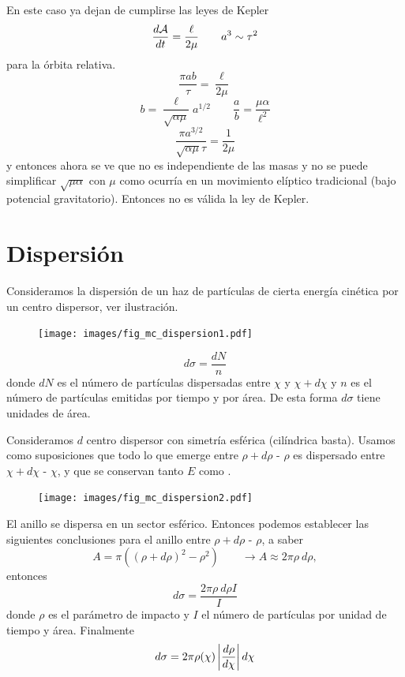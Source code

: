 \documentclass[10pt,oneside]{CBFT_book}
\begin{document}
En este caso ya dejan de cumplirse las leyes de Kepler
\[
	\frac{d^{\hspace{-0.05em}} {\mathcal{A}}}{d {t}^{\hspace{-0.05em}}} = \frac{\ell}{2\mu} \qquad a^3 \sim \tau^2 
\]
para la órbita relativa.
\[
	\frac{\pi a b }{\tau}= \frac{\ell}{2\mu} 
\]
\[
	b = \frac{\ell}{\sqrt{\alpha \mu}} a^{1/2} \qquad \frac{a}{b} = \frac{\mu \alpha}{\ell^2}
\]
\[
	\frac{\pi a^{3/2}}{\sqrt{\alpha \mu} \tau} = \frac{1}{2\mu}
\]
y entonces ahora se ve que no es independiente de las masas y no se puede simplificar $\sqrt{\mu\alpha}$ con
$\mu$ como ocurría en un movimiento elíptico tradicional (bajo potencial gravitatorio).
Entonces no es válida la ley de Kepler.
\section{Dispersión}

Consideramos la dispersión de un haz de partículas de cierta energía cinética por un centro dispersor,
ver ilustración.

\begin{figure}[htb]
	\begin{center}
	\texttt{[image: images/fig\_mc\_dispersion1.pdf]}	 
	\end{center}
	\caption{}
\end{figure} 
\[
	d\sigma = \frac{dN}{n}
\]
donde $dN$ es el número de partículas dispersadas entre $\chi$ y $\chi + d\chi$ y $n$ es el número de
partículas emitidas por tiempo y por área. De esta forma $d\sigma$ tiene unidades de área.

Consideramos $d$ centro dispersor con simetría esférica (cilíndrica basta).
Usamos como suposiciones que todo lo que emerge entre $\rho + d\rho$ - $\rho$  es dispersado entre
$\chi + d\chi$ - $\chi$, y que se conservan tanto $E$ como .

\begin{figure}[htb]
	\begin{center}
	\texttt{[image: images/fig\_mc\_dispersion2.pdf]}	 
	\end{center}
	\caption{}
\end{figure}

El anillo se dispersa en un sector esférico. Entonces podemos establecer las siguientes conclusiones
para el anillo entre $\rho + d\rho$ - $\rho$, a saber
\[
	A =  \pi ( (\rho + d\rho)^2 - \rho^2 ) \qquad \longrightarrow A \approx 2 \pi \rho \: d\rho,
\]
entonces
\[
	d\sigma = \frac{  2 \pi \rho \: d\rho I}{I}
\]
donde $\rho$ es el parámetro de impacto y $I$ el número de partículas por unidad de tiempo y área.
Finalmente
\[
	d\sigma =  2 \pi \rho(\chi) \left| \frac{d^{\hspace{-0.05em}} {\rho}}{d {\chi}^{\hspace{-0.05em}}} \right| d\chi
\]
\end{document}
